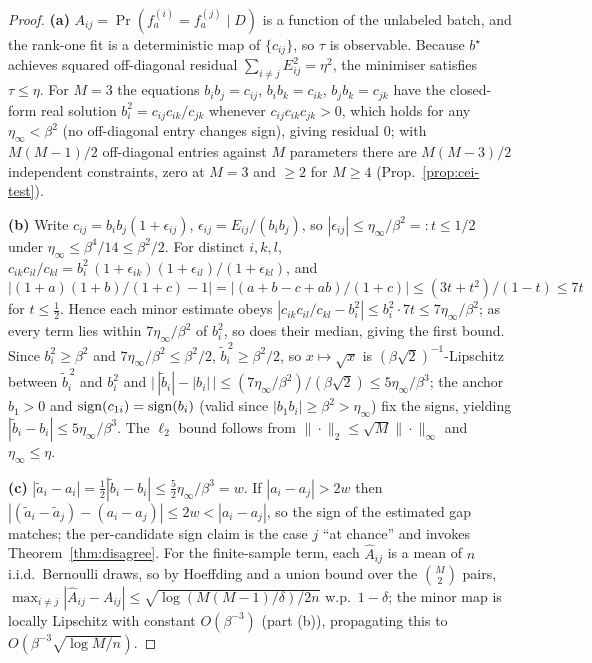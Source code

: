 \begin{proof}
\textbf{(a)} $A_{ij}=\Pr(f_a^{(i)}{=}f_a^{(j)}\mid D)$ is a function of the
unlabeled batch, and the rank-one fit is a deterministic map of $\{c_{ij}\}$, so
$\tau$ is observable. Because $b^\star$ achieves squared off-diagonal residual
$\sum_{i\neq j}E_{ij}^2=\eta^2$, the minimiser satisfies $\tau\le\eta$. For
$M{=}3$ the equations $b_ib_j=c_{ij}$, $b_ib_k=c_{ik}$, $b_jb_k=c_{jk}$ have the
closed-form real solution $b_i^2=c_{ij}c_{ik}/c_{jk}$ whenever
$c_{ij}c_{ik}c_{jk}>0$, which holds for any $\eta_\infty<\beta^2$ (no off-diagonal
entry changes sign), giving residual $0$; with $M(M{-}1)/2$ off-diagonal entries
against $M$ parameters there are $M(M{-}3)/2$ independent constraints, zero at
$M{=}3$ and $\ge2$ for $M\ge4$ (Prop.~\ref{prop:cei-test}).

\textbf{(b)} Write $c_{ij}=b_ib_j(1+\epsilon_{ij})$, $\epsilon_{ij}=E_{ij}/(b_ib_j)$,
so $|\epsilon_{ij}|\le\eta_\infty/\beta^2=:t\le1/2$ under $\eta_\infty\le\beta^4/14
\le\beta^2/2$. For distinct $i,k,l$,
$c_{ik}c_{il}/c_{kl}=b_i^2\,(1+\epsilon_{ik})(1+\epsilon_{il})/(1+\epsilon_{kl})$,
and $\bigl|(1{+}a)(1{+}b)/(1{+}c)-1\bigr|=\bigl|(a{+}b{-}c{+}ab)/(1{+}c)\bigr|
\le(3t+t^2)/(1-t)\le7t$ for $t\le\tfrac12$. Hence each minor estimate obeys
$|c_{ik}c_{il}/c_{kl}-b_i^2|\le b_i^2\cdot7t\le7\eta_\infty/\beta^2$; as every
term lies within $7\eta_\infty/\beta^2$ of $b_i^2$, so does their median, giving
the first bound. Since $b_i^2\ge\beta^2$ and $7\eta_\infty/\beta^2\le\beta^2/2$,
$\widetilde b_i^{\,2}\ge\beta^2/2$, so $x\mapsto\sqrt x$ is
$(\beta\sqrt2)^{-1}$-Lipschitz between $\widetilde b_i^{\,2}$ and $b_i^2$ and
$\bigl|\,|\widetilde b_i|-|b_i|\,\bigr|\le(7\eta_\infty/\beta^2)/(\beta\sqrt2)
\le5\eta_\infty/\beta^3$; the anchor $b_1>0$ and $\operatorname{sign}(c_{1i})=\operatorname{sign}(b_i)$ (valid
since $|b_1b_i|\ge\beta^2>\eta_\infty$) fix the signs, yielding
$|\widetilde b_i-b_i|\le5\eta_\infty/\beta^3$. The $\ell_2$ bound follows from
$\|\cdot\|_2\le\sqrt M\|\cdot\|_\infty$ and $\eta_\infty\le\eta$.

\textbf{(c)} $|\widetilde a_i-a_i|=\tfrac12|\widetilde b_i-b_i|\le\tfrac52
\eta_\infty/\beta^3=w$. If $|a_i-a_j|>2w$ then
$|(\widetilde a_i-\widetilde a_j)-(a_i-a_j)|\le2w<|a_i-a_j|$, so the sign of the
estimated gap matches; the per-candidate sign claim is the case $j$ ``at chance''
and invokes Theorem~\ref{thm:disagree}. For the finite-sample term, each
$\widehat A_{ij}$ is a mean of $n$ i.i.d.\ Bernoulli draws, so by Hoeffding and a
union bound over the $\binom M2$ pairs,
$\max_{i\neq j}|\widehat A_{ij}-A_{ij}|\le\sqrt{\log(M(M{-}1)/\delta)/2n}$ w.p.\
$1-\delta$; the minor map is locally Lipschitz with constant
$O(\beta^{-3})$ (part (b)), propagating this to
$O(\beta^{-3}\sqrt{\log M/n})$.


\end{proof}
